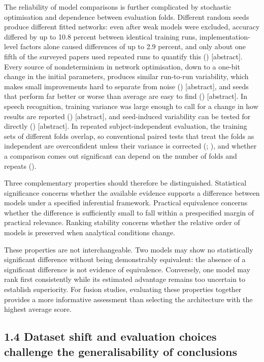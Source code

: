 \documentclass[11pt,a4paper]{article}
\begin{document}
The reliability of model comparisons is further complicated by stochastic optimisation
and dependence between evaluation folds. Different random seeds produce different fitted
networks: even after weak models were excluded, accuracy differed by up to 10.8 percent
between identical training runs, implementation-level factors alone caused differences
of up to 2.9 percent, and only about one fifth of the surveyed papers used repeated runs
to quantify this (\citealp{Pham_2020}) {[}abstract{]}. Every source of nondeterminism in network
optimisation, down to a one-bit change in the initial parameters, produces similar
run-to-run variability, which makes small improvements hard to separate from noise
(\citealp{Summers2021arxiv}) {[}abstract{]}, and seeds that perform far better or worse than
average are easy to find (\citealp{Picard2021arxiv}) {[}abstract{]}. In speech recognition, training
variance was large enough to call for a change in how results are reported (\citealp{van_den_Berg_2017}) {[}abstract{]}, and seed-induced variability can be tested for directly
(\citealp{Banerjee_2025}) {[}abstract{]}. In repeated subject-independent evaluation, the
training sets of different folds overlap, so conventional paired tests that treat the
folds as independent are overconfident unless their variance is corrected (\citealp{Nadeau_2003}; \citealp{Bouckaert_2004}), and whether a comparison comes out significant
can depend on the number of folds and repeats (\citealp{Jafrasteh_2025}).

Three complementary properties should therefore be distinguished. Statistical
significance concerns whether the available evidence supports a difference between
models under a specified inferential framework. Practical equivalence concerns whether
the difference is sufficiently small to fall within a prespecified margin of practical
relevance. Ranking stability concerns whether the relative order of models is preserved
when analytical conditions change.

These properties are not interchangeable. Two models may show no statistically
significant difference without being demonstrably equivalent: the absence of a
significant difference is not evidence of equivalence. Conversely, one model may rank
first consistently while its estimated advantage remains too uncertain to establish
superiority. For fusion studies, evaluating these properties together provides a more
informative assessment than selecting the architecture with the highest average score.

\subsection{1.4 Dataset shift and evaluation choices challenge the generalisability of conclusions}\label{dataset-shift-and-evaluation-choices-challenge-the-generalisability-of-conclusions}
\end{document}
